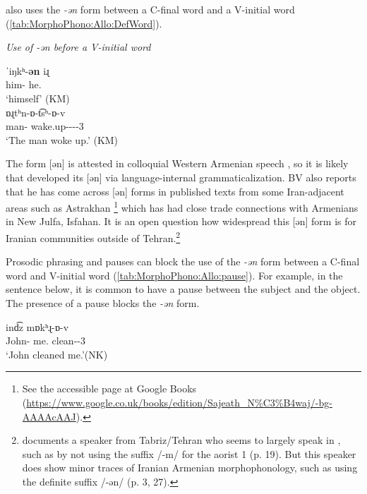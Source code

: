 {\iaIA} also uses the     \textit{{-ən}} form   between a C-final word and a V-initial word (\ref{tab:MorphoPhono:Allo:DefWord}).
		
		\begin{exe}
			\ex \textit{Use of -ən before a V-initial word} \label{tab:MorphoPhono:Allo:DefWord}
			
			\begin{xlist}
				\ex \gll 	 ˈiŋkʰ-\textbf{ən} iɻ 
				\\
				him-{} he.{\gen} 
				\\ \trans  `himself' \hfill (KM)  \\   
				\ex {}   {ɒɻtʰn-ɒ-t͡sʰ-ɒ-v}
				\\  man-{}  wake.up-{\lvgloss}-{\aorperf}-{\pst}-3{\sg}  \\ \trans  `The man woke up.' \hfill (KM) \\  
			\end{xlist}
			
			
		\end{exe}
		
	The form [ən] is attested in colloquial Western Armenian speech \citep{Dolatian-prep-Definite}, so it is likely that {\iaIA} developed its [ən] via language-internal grammaticalization. BV also reports that he has come across [ən] forms in published texts from some Iran-adjacent areas such as Astrakhan \citep[121]{SayatNova}\footnote{See the accessible page at Google Books (\url{https://www.google.co.uk/books/edition/Sajeath\_N\%C3\%B4waj/-bg-AAAAcAAJ}).} which has had close trade connections with Armenians in New Julfa, Isfahan. It is an open question how widespread this [ən] form is for Iranian communities outside of Tehran.\footnote{\citet{Stevick-1955-SyntaxColloquailEasternArmenian} documents a speaker from Tabriz/Tehran who seems to largely speak in {\seaSEA}, such as by not using the suffix /-m/ for the aorist 1{\sg} (p. 19). But this speaker does show minor traces of Iranian Armenian morphophonology, such as   using the definite suffix /-ən/ (p. 3, 27).   } 
	
		Prosodic phrasing and pauses can block the use of the \textit{-{ən}} form between a C-final word and V-initial word (\ref{tab:MorphoPhono:Allo:pause}). For example, in the sentence below, it is common to have a pause between the subject and the object. The presence of a pause blocks the \textit{{-ən}} form.
		
		\begin{exe}
			\ex {} {ind͡z} {mɒkʰɻ-ɒ-v}
			\\
			John-{} me.{\dat} clean-{\pst}-3{\sg}
			\\
			\trans	`John cleaned me.'\hfill (NK) \label{tab:MorphoPhono:Allo:pause}
			\\
			\armenian{Ջոնը ինձ մաքրաւ։}
			
		\end{exe}	
		
